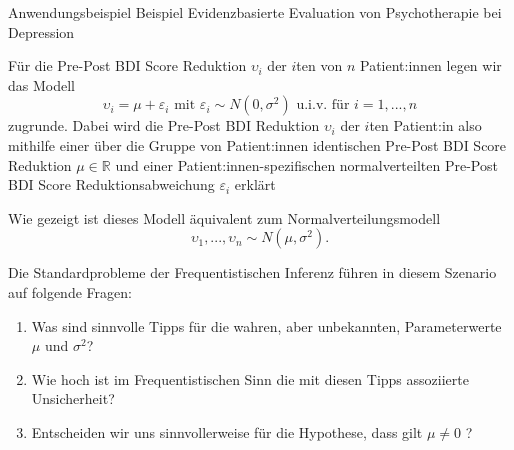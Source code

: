\documentclass[
  8pt,
  ignorenonframetext,
]{beamer}
\providecommand{\tightlist}{%
  \setlength{\itemsep}{0pt}\setlength{\parskip}{0pt}}
\newcommand{\ups} {\upsilon}
\begin{document}
\begin{frame}[t]{Anwendungsbeispiel}
\protect\hypertarget{anwendungsbeispiel-2}{}
Beispiel \textbar{} Evidenzbasierte Evaluation von Psychotherapie bei
Depression \vspace{2mm}

\small

Für die Pre-Post BDI Score Reduktion \(\ups_i\) der \(i\)ten von \(n\)
Patient:innen legen wir das Modell \begin{equation}
\ups_{i} = \mu + \varepsilon_{i} \mbox{ mit } \varepsilon_{i} \sim N(0,\sigma^2) \mbox{ u.i.v. für } i = 1,...,n
\end{equation} zugrunde. Dabei wird die Pre-Post BDI Reduktion
\(\ups_i\) der \(i\)ten Patient:in also mithilfe einer über die Gruppe
von Patient:innen identischen Pre-Post BDI Score Reduktion
\(\mu \in \mathbb{R}\) und einer Patient:innen-spezifischen
normalverteilten Pre-Post BDI Score Reduktionsabweichung
\(\varepsilon_{i}\) erklärt

Wie gezeigt ist dieses Modell äquivalent zum Normalverteilungsmodell
\begin{equation}
\ups_1,...,\ups_n \sim N(\mu,\sigma^2).
\end{equation}

Die Standardprobleme der Frequentistischen Inferenz führen in diesem
Szenario auf folgende Fragen:

\begin{enumerate}
[(1)]
\tightlist
\item
  Was sind sinnvolle Tipps für die wahren, aber unbekannten,
  Parameterwerte \(\mu\) und \(\sigma^2\)?
\item
  Wie hoch ist im Frequentistischen Sinn die mit diesen Tipps
  assoziierte Unsicherheit?
\item
  Entscheiden wir uns sinnvollerweise für die Hypothese, dass gilt
  \(\mu\neq 0\) ?
\end{enumerate}
\end{frame}
\end{document}
